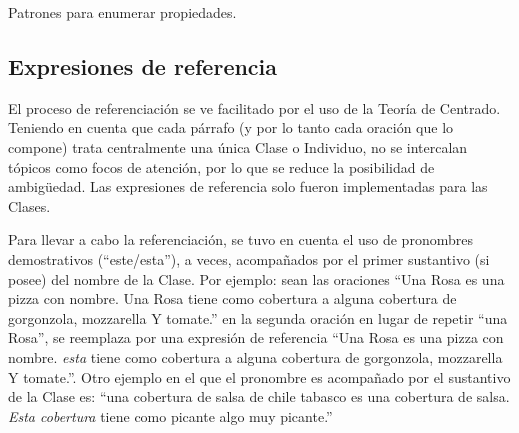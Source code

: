 \begin{GrammarEnv}
\begin{grammar}
\end{grammar}
\caption{Patrones para enumerar propiedades.}\label{gram:propiedades}
\end{GrammarEnv}



\subsection{Expresiones de referencia}
El proceso de referenciación se ve facilitado por el uso de la Teoría de Centrado. 
Teniendo en cuenta que cada párrafo (y por lo tanto cada oración que lo compone) trata centralmente una única Clase o Individuo, no se intercalan tópicos como focos de atención, por lo que se reduce la posibilidad de ambigüedad. Las expresiones de referencia solo fueron implementadas para las Clases.

Para llevar a cabo la referenciación, se tuvo en cuenta el uso de pronombres demostrativos (``este/esta''), a veces, acompañados por el primer sustantivo (si posee) del nombre de la Clase. Por ejemplo: sean las oraciones ``Una Rosa es una pizza con nombre. Una Rosa tiene como cobertura a alguna cobertura de gorgonzola, mozzarella Y tomate.'' en la segunda oración en lugar de repetir ``una Rosa'', se reemplaza por una expresión de referencia ``Una Rosa es una pizza con nombre. \emph{esta} tiene como cobertura a alguna cobertura de gorgonzola, mozzarella Y tomate.''. Otro ejemplo en el que el pronombre es acompañado por el sustantivo de la Clase es: ``una cobertura de salsa de chile tabasco es una cobertura de salsa. \emph{Esta cobertura} tiene como picante algo muy picante.''



